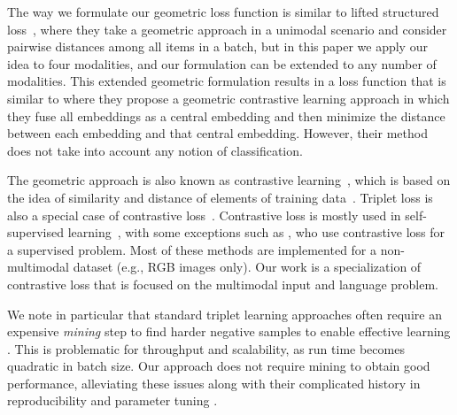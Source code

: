 \documentclass[10pt]{article} %
\begin{document}
The way we formulate our geometric loss function is similar to lifted structured loss~\citep{songCVPR16LiftedStructured}, where they take a geometric approach in a unimodal scenario and consider pairwise distances among all items in a batch, but in this paper we apply our idea to four modalities, and our formulation can be extended to any number of modalities.
This extended geometric formulation results in a loss function that is similar to \citet{ICML22GeometricMultimodal} where they propose a geometric contrastive learning approach in which they %
fuse all embeddings as a central embedding and then minimize the distance between each embedding and that central embedding. However, their method does not take into account any notion of classification.

The geometric approach is also known as contrastive learning~\citep{qin2021world}, which is based on the idea of similarity and distance of elements of training data~\citep{Carvalho-cooking-triplet,triplet_loss_2021_CVPR,salvador2017cooking}. Triplet loss is also a special case of contrastive loss~\citep{NEURIPS2020_supervised_contrastive}. Contrastive loss is mostly used in self-supervised learning~\citep{bui2021self, alayrac2020self,chen2020simple}, with some exceptions such as \citet{NEURIPS2020_supervised_contrastive}, who use contrastive loss for a supervised problem. Most of these methods are implemented for a non-multimodal dataset (e.g., RGB images only). Our work is a specialization of contrastive loss that is focused on the multimodal input and language problem.

We note in particular that standard triplet learning approaches often require an expensive \textit{mining} step to find harder negative samples to enable effective learning \citep{Hoffer2015,Schroff2015,DBLP:conf/eccv/2018-9,DBLP:conf/eccv/ZhaoJQLH18,Zhai2018}. This is problematic for throughput and scalability, as run time becomes quadratic in batch size. Our approach does not require mining to obtain good performance, alleviating these issues along with their complicated history in reproducibility and parameter tuning \citep{Musgrave2020,Raff2020c,Raff2019_quantify_repro}. 
\end{document}
